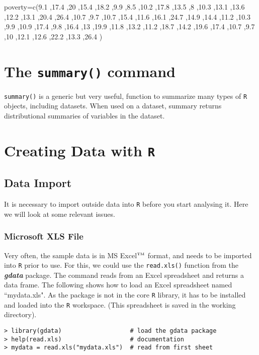 \documentclass[a4paper,12pt]{article}
\begin{document}
poverty=c(9.1 ,17.4 ,20 ,15.4 ,18.2 ,9.9 ,8.5 ,10.2 ,17.8 ,13.5 ,8 ,10.3 ,13.1 ,13.6 ,12.2 ,13.1 ,20.4 ,26.4 ,10.7 ,9.7 ,10.7 ,15.4 ,11.6 ,16.1 ,24.7 ,14.9 ,14.4 ,11.2 ,10.3 ,9.9 ,10.9 ,17.4 ,9.8 ,16.4 ,13 ,19.9 ,11.8 ,13.2 ,11.2 ,18.7 ,14.2 ,19.6 ,17.4 ,10.7 ,9.7 ,10 ,12.1 ,12.6 ,22.2 ,13.3 ,26.4 )




\newpage



\section{The \texttt{summary()} command}
\texttt{summary()} is a generic but very useful, function to summarize many types of \texttt{R} objects, including datasets. When used on a dataset, summary returns distributional summaries of variables in the dataset.

\section{Creating Data with \texttt{R}}

\subsection{Data Import}
It is necessary to import outside data into \texttt{R} before you start analysing it. Here we will look at some relevant issues.

\subsubsection{Microsoft XLS File}
Very often, the sample data is in MS Excel$^{\mbox{\tiny{TM}}}$ format, and needs to be imported into \texttt{R} prior to use. For this, we could use the \texttt{read.xls()} function from the \textbf{\textit{gdata}} package. The command reads from an Excel spreadsheet and returns a data frame. The following shows how to load an Excel spreadsheet named ``mydata.xls". As the package is not in the core \texttt{R} library, it has to be installed and loaded into the \texttt{R} workspace. (This spreadsheet is saved in the working directory).
\begin{verbatim}
> library(gdata)                   # load the gdata package
> help(read.xls)                   # documentation
> mydata = read.xls("mydata.xls")  # read from first sheet
\end{verbatim}
\end{document}
